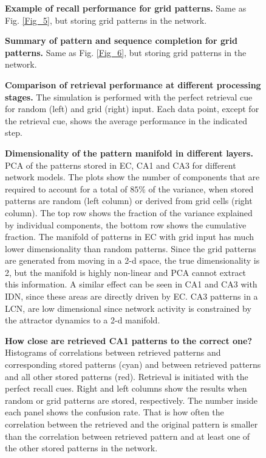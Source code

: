 \documentclass[utf8]{frontiersSCNS} %
\begin{document}
\begin{figure}[!htb]
\caption{\textbf{Example of recall performance for grid patterns.} Same as Fig. \ref{Fig_5}, but storing grid patterns in the network.}
\label{Fig_7}
\end{figure}

\begin{figure}[!htb]
\caption{\textbf{Summary of pattern and sequence completion for grid patterns.} Same as Fig. \ref{Fig_6}, but storing grid patterns in the network.}
\label{Fig_8}
\end{figure}

\begin{figure}[!htb]
\caption{\textbf{Comparison of retrieval performance at different processing stages.} The simulation is performed with the perfect retrieval cue for random (left) and grid (right) input. Each data point, except for the retrieval cue, shows the average performance in the indicated step.}
\label{Fig_9}
\end{figure}



\begin{figure}[!htb]
\caption{\textbf{Dimensionality of the pattern manifold in different layers.} PCA of the patterns stored in EC, CA1 and CA3 for different network models. The plots show the number of components that are required to account for a total of $85 \%$ of the variance, when stored patterns are random (left column) or derived from grid cells (right column). The top row shows the fraction of the variance explained by individual components, the bottom row shows the cumulative fraction. The manifold of patterns in EC with grid input has much lower dimensionality than random patterns. Since the grid patterns are generated from moving in a 2-d space, the true dimensionality is 2, but the manifold is highly non-linear and PCA cannot extract this information. A similar effect can be seen in CA1 and CA3 with IDN, since these areas are directly driven by EC. CA3 patterns in a LCN, are low dimensional since network activity is constrained by the attractor dynamics to a 2-d manifold.}
\label{Fig_10}
\end{figure}


\begin{figure}[!htb]
\caption{\textbf{How close are retrieved CA1 patterns to the correct one?} Histograms of correlations between retrieved patterns and corresponding stored patterns (cyan) and between retrieved patterns and all other stored patterns (red). Retrieval is initiated with the perfect recall cues. Right and left columns show the results when random or grid patterns are stored, respectively. The number inside each panel shows the confusion rate. That is how often the correlation between the retrieved and the original pattern is smaller than the correlation between retrieved pattern and at least one of the other stored patterns in the network.} 
\label{Fig_11}
\end{figure}
\end{document}
